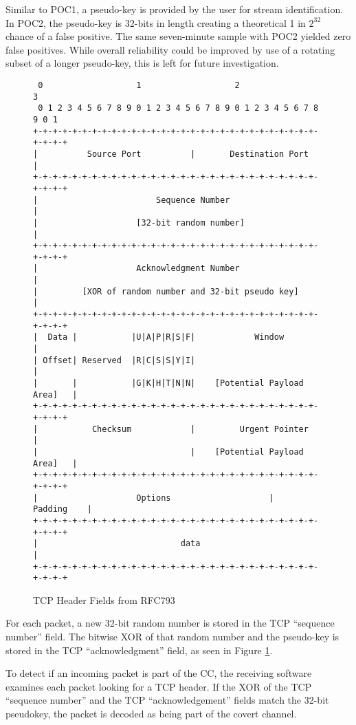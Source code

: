 \documentclass[letterpaper,10pt,draft]{article}
\begin{document}
Similar to POC1, a pseudo-key is provided by the user for stream
identification.  In POC2, the pseudo-key is 32-bits in length creating
a theoretical 1 in $2^{32}$ chance of a false positive.  The same
seven-minute sample with POC2 yielded zero false positives.  While
overall reliability could be improved by use of a rotating subset of a
longer pseudo-key, this is left for future investigation.

\begin{figure}
\begin{center}
\begin{verbatim}
 0                   1                   2                   3   
 0 1 2 3 4 5 6 7 8 9 0 1 2 3 4 5 6 7 8 9 0 1 2 3 4 5 6 7 8 9 0 1 
+-+-+-+-+-+-+-+-+-+-+-+-+-+-+-+-+-+-+-+-+-+-+-+-+-+-+-+-+-+-+-+-+
|          Source Port          |       Destination Port        |
+-+-+-+-+-+-+-+-+-+-+-+-+-+-+-+-+-+-+-+-+-+-+-+-+-+-+-+-+-+-+-+-+
|                        Sequence Number                        |
|                    [32-bit random number]                     |
+-+-+-+-+-+-+-+-+-+-+-+-+-+-+-+-+-+-+-+-+-+-+-+-+-+-+-+-+-+-+-+-+
|                    Acknowledgment Number                      |
|         [XOR of random number and 32-bit pseudo key]          |
+-+-+-+-+-+-+-+-+-+-+-+-+-+-+-+-+-+-+-+-+-+-+-+-+-+-+-+-+-+-+-+-+
|  Data |           |U|A|P|R|S|F|            Window             |
| Offset| Reserved  |R|C|S|S|Y|I|                               |
|       |           |G|K|H|T|N|N|    [Potential Payload Area]   |
+-+-+-+-+-+-+-+-+-+-+-+-+-+-+-+-+-+-+-+-+-+-+-+-+-+-+-+-+-+-+-+-+
|           Checksum            |         Urgent Pointer        |
|                               |    [Potential Payload Area]   |
+-+-+-+-+-+-+-+-+-+-+-+-+-+-+-+-+-+-+-+-+-+-+-+-+-+-+-+-+-+-+-+-+
|                    Options                    |    Padding    |
+-+-+-+-+-+-+-+-+-+-+-+-+-+-+-+-+-+-+-+-+-+-+-+-+-+-+-+-+-+-+-+-+
|                             data                              |
+-+-+-+-+-+-+-+-+-+-+-+-+-+-+-+-+-+-+-+-+-+-+-+-+-+-+-+-+-+-+-+-+
\end{verbatim}
\caption{TCP Header Fields from RFC793}
\label{TCPHeader}
\end{center}
\end{figure}

For each packet, a new 32-bit random number is stored in the TCP
``sequence number'' field.  The bitwise XOR of that random number and the
pseudo-key is stored in the TCP ``acknowledgment'' field, as seen in
Figure \ref{TCPHeader}.

To detect if an incoming packet is part of the CC, the receiving
software examines each packet looking for a TCP header.  If the XOR of
the TCP ``sequence number'' and the TCP ``acknowledgement'' fields
match the 32-bit pseudokey, the packet is decoded as being part of the
covert channel.
\end{document}
